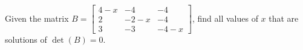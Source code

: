 Given the matrix 
$B = 
\begin{bmatrix} 
4 - x & -4 & -4\\ 
2 & -2 - x & -4\\ 
3 & -3 & -4 -x
\end{bmatrix}$, 
find all values of $x$ that are solutions of $\det(B) = 0$.